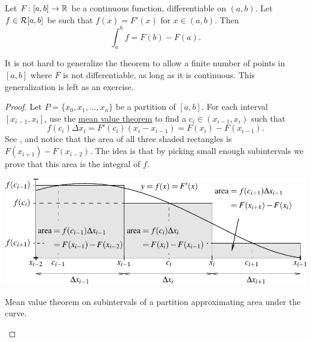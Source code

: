 \begin{thm} \label{thm:FTCv1}
Let $F \colon [a,b] \to {\mathbb{R}}$ be a continuous function, differentiable
on $(a,b)$.  Let $f \in {\mathcal{R}}[a,b]$ be such that $f(x) = F'(x)$ for $x \in
(a,b)$.  Then
\begin{equation*}
\int_a^b f = F(b)-F(a) .
\end{equation*}
\end{thm}

It is not hard to generalize the theorem to allow a finite number of points
in $[a,b]$ where $F$ is not differentiable, as long as it is continuous.
This generalization is left as an exercise.

\begin{proof}
Let $P = \{ x_0, x_1, \ldots, x_n \}$ be a partition of $[a,b]$.
For each interval $[x_{i-1},x_i]$, use the
\hyperref[thm:mvt]{mean value theorem} to find a
$c_i \in (x_{i-1},x_i)$ such that
\begin{equation*}
f(c_i) \Delta x_i = F'(c_i) (x_i - x_{i-1}) = F(x_i) - F(x_{i-1}) .
\end{equation*}
See , and
notice that the area of all
three shaded rectangles is $F(x_{i+1})-F(x_{i-2})$.
The idea is that by picking small enough subintervals
we prove that this area is the integral of $f$.
\begin{myfigureht}
\includegraphics{figures/fundthmfig}
\caption{Mean value theorem on subintervals of a partition
approximating area under the curve.\label{fig:fundthmfig}}
\end{myfigureht}


\end{proof}
